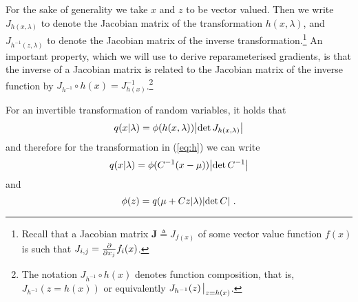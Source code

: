 \documentclass[a4paper,11pt]{article}
\begin{document}
For the sake of generality we take $x$ and $z$ to be vector valued. Then we write $J_{h(x, \lambda)}$ to denote the Jacobian matrix of the transformation $h(x, \lambda)$, and $J_{h^{-1}(z, \lambda)}$ to denote the Jacobian matrix of the inverse transformation.\footnote{Recall that a Jacobian matrix $\mathbf J \triangleq J_{f(x)}$ of some vector value function $f(x)$ is such that $J_{i,j} = \pdv{x_j} f_i(x)$.} 
An important property, which we will use to derive reparameterised gradients, is that the inverse of a Jacobian matrix is related to the Jacobian matrix of the inverse function by $J_{h^{-1}} \circ h(x)= J^{-1}_{h(x)}$.\footnote{The notation $J_{h^{-1}} \circ h(x)$ denotes function composition, that is, $J_{h^{-1}}(z=h(x))$ or equivalently $J_{h^{-1}}(z)\evaluated_{z=h(x)}$.}

For an invertible transformation of random variables, it holds that %
\begin{equation}
q(x|\lambda) = \phi(h(x, \lambda))\abs{\det J_{h(x, \lambda)}}
\end{equation}
and therefore for the transformation in (\ref{eq:h}) we can write
\begin{equation}
q(x|\lambda) = \phi(C^{-1}(x - \mu))\abs{\det C^{-1}} 
\end{equation}
and
\begin{equation}
\phi(z) = q(\mu + Cz| \lambda)\abs{\det C} ~ .
\end{equation}
\end{document}
